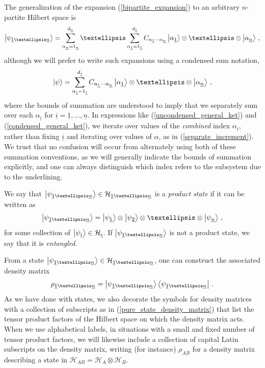 \documentclass[12pt]{article}
\newcommand{\ul}[1]{{\underline{#1}}}
\numberwithin{equation}{section}
\newcommand{\Honeton}{{\mathcal{H}_{\ul{1} \ldots \ul{n}}}}
\begin{document}
The generalization of the expansion (\ref{bipartite_expansion}) to an arbitrary $n$-partite Hilbert space is
%
\begin{align}\label{uncondensed_general_ket}
    \ket{\psi_{\ul{1} \ldots \ul{n}}} = \sum_{\alpha_\ul{n} = 1_{\ul{n}}}^{d_\ul{n}} \ldots \sum_{\alpha_\ul{1} = 1_{\ul{1}}}^{d_\ul{1}} C_{\alpha_\ul{1} \cdots \alpha_\ul{n}} \ket{ \alpha_\ul{1}} \otimes \ldots \otimes \ket{ \alpha_\ul{n} } \, ,
\end{align}
%
although we will prefer to write such expansions using a condensed sum notation,
%
\begin{align}\label{condensed_general_ket}
    \ket{\psi} = \sum_{\alpha_\ul{i} = 1_{\ul{i}}}^{d_\ul{i}} C_{\alpha_\ul{1} \cdots \alpha_\ul{n}} \ket{ \alpha_\ul{1}} \otimes \ldots \otimes \ket{ \alpha_\ul{n} } \, ,
\end{align}
%
where the bounds of summation are understood to imply that we separately sum over each $\alpha_\ul{i}$ for $\ul{i} = \ul{1} , \ldots , \ul{n}$. In expressions like (\ref{uncondensed_general_ket}) and (\ref{condensed_general_ket}), we iterate over values of the \emph{combined} index $\alpha_{\ul{i}}$, rather than fixing $\ul{i}$ and iterating over values of $\alpha$, as in (\ref{separate_increment}). We trust that no confusion will occur from alternately using both of these summation conventions, as we will generally indicate the bounds of summation explicitly, and one can always distinguish which index refers to the subsystem due to the underlining.

We say that $\ket{\psi_{\ul{1} \ldots \ul{n}}} \in \mathcal{H}_{\ul{1} \ldots \ul{n}}$ is a \emph{product state} if it can be written as
%
\begin{align}
    \ket{\psi_{\ul{1} \ldots \ul{n}}} = \ket{\psi_\ul{1}} \otimes \ket{\psi_\ul{2}} \otimes \ldots \otimes \ket{\psi_\ul{n}} \, ,
\end{align}
%
for some collection of $\ket{\psi_\ul{i}} \in \mathcal{H}_\ul{i}$. If $\ket{\psi_{\ul{1} \ldots \ul{n}}} $ is not a product state, we say that it is \emph{entangled}.

From a state $\ket{\psi_{\ul{1} \ldots \ul{n}}} \in \Honeton$, one can construct the associated density matrix
%
\begin{align}\label{pure_state_density_matrix}
    \rho_{\ul{1} \ldots \ul{n}} = \ket{\psi_{\ul{1} \ldots \ul{n}}} \bra{\psi_{\ul{1} \ldots \ul{n}}} \, .
\end{align}
%
As we have done with states, we also decorate the symbols for density matrices with a collection of subscripts as in (\ref{pure_state_density_matrix}) that list the tensor product factors of the Hilbert space on which the density matrix acts. When we use alphabetical labels, in situations with a small and fixed number of tensor product factors, we will likewise include a collection of capital Latin subscripts on the density matrix, writing (for instance) $\rho_{AB}$ for a density matrix describing a state in $\mathcal{H}_{AB} = \mathcal{H}_A \otimes \mathcal{H}_B$. 
\end{document}
